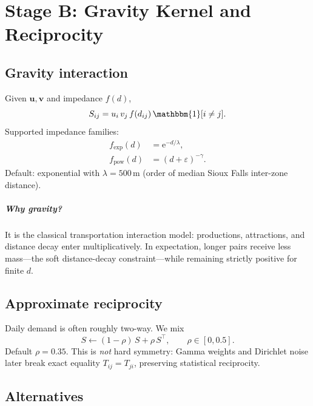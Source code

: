 \documentclass[11pt,a4paper]{report}
\newcommand{\mathbfu}{\mathbf{u}}
\newcommand{\mathbfv}{\mathbf{v}}
\begin{document}
\chapter{Stage B: Gravity Kernel and Reciprocity}
\label{ch:fp-gravity}

\section{Gravity interaction}

Given $\mathbfu,\mathbfv$ and impedance $f(d)$,
\begin{equation}
  S_{ij} = u_i\, v_j\, f(d_{ij})\, \mathbbm{1}[i\neq j].
  \label{eq:fp-gravity}
\end{equation}
Supported impedance families:
\begin{align}
  f_{\mathrm{exp}}(d) &= \mathrm{e}^{-d/\lambda}, \\
  f_{\mathrm{pow}}(d) &= (d+\varepsilon)^{-\gamma}.
\end{align}
Default: exponential with $\lambda=500\,\mathrm{m}$ (order of median Sioux Falls inter-zone distance).

\paragraph{Why gravity?}
It is the classical transportation interaction model: productions, attractions, and distance decay enter multiplicatively. In expectation, longer pairs receive less mass---the soft distance-decay constraint---while remaining strictly positive for finite $d$.

\section{Approximate reciprocity}

Daily demand is often roughly two-way. We mix
\begin{equation}
  S \leftarrow (1-\rho)\,S + \rho\, S^\top, \qquad \rho\in[0,0.5].
  \label{eq:fp-reciprocity}
\end{equation}
Default $\rho=0.35$. This is \emph{not} hard symmetry: Gamma weights and Dirichlet noise later break exact equality $T_{ij}=T_{ji}$, preserving statistical reciprocity.

\section{Alternatives}
\end{document}
